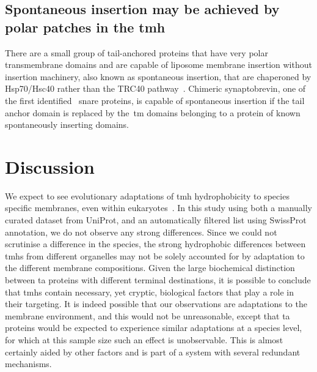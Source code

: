 
\subsection{Spontaneous insertion may be achieved by polar patches in the \gls{tmh}}

There are a small group of tail-anchored proteins that have very polar transmembrane domains and are capable of liposome membrane insertion without insertion machinery, also known as spontaneous insertion, that are chaperoned by Hsp70/Hsc40 rather than the TRC40 pathway~\cite{Rabu2008, Rabu2009, Colombo2009}.
Chimeric synaptobrevin, one of the first identified~ \gls{snare} proteins, is capable of spontaneous insertion if the tail anchor domain is replaced by the~\gls{tm} domains belonging to a protein of known spontaneously inserting domains.

\section{Discussion}

We expect to see evolutionary adaptations of \gls{tmh} hydrophobicity to species specific membranes, even within eukaryotes~\cite{Baker2017, Sharpe2010}.
In this study using both a manually curated dataset from UniProt, and an automatically filtered list using SwissProt annotation, we do not observe any strong differences.
Since we could not scrutinise a difference in the species, the strong hydrophobic differences between \gls{tmh}s from different organelles may not be solely accounted for by adaptation to the different membrane compositions.
Given the large biochemical distinction between \gls{ta} proteins with different terminal destinations, it is possible to conclude that \gls{tmh}s contain necessary, yet cryptic, biological factors that play a role in their targeting.
It is indeed possible that our observations are adaptations to the membrane environment, and this would not be unreasonable, except that \gls{ta} proteins would be expected to experience similar adaptations at a species level, for which at this sample size such an effect is unobservable.
This is almost certainly aided by other factors and is part of a system with several redundant mechanisms.

